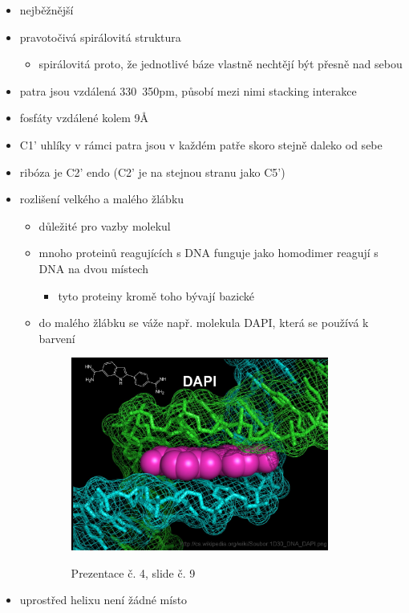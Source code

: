 \documentclass[DIV=8]{scrreprt}
\begin{document}
\begin{itemize}[nosep]
    \item nejběžnější
    \item pravotočivá spirálovitá struktura
\begin{itemize}[nosep]
    \item spirálovitá proto, že jednotlivé báze vlastně nechtějí být přesně nad sebou
\end{itemize}

    \item patra jsou vzdálená 330~350pm, působí mezi nimi stacking interakce
    \item fosfáty vzdálené kolem 9Å
    \item C1' uhlíky v rámci patra jsou v každém patře skoro stejně daleko od sebe
    \item ribóza je C2' endo (C2' je na stejnou stranu jako C5')
    \item rozlišení velkého a malého žlábku
\begin{itemize}[nosep]
    \item důležité pro vazby molekul
    \item mnoho proteinů reagujících s DNA funguje jako homodimer reagují s DNA na dvou místech
\begin{itemize}[nosep]
    \item tyto proteiny kromě toho bývají bazické
\end{itemize}

    \item do malého žlábku se váže např. molekula DAPI, která se používá k barvení \begin{figure}
    \caption{Prezentace č. 4, slide č. 9}
    \includegraphics[width=0.85\textwidth]{slides-4/slide-9.jpg}
    \centering
    \label{slides-4-slide-9}
\end{figure}

\end{itemize}

    \item uprostřed helixu není žádné místo
\end{itemize}
\end{document}
